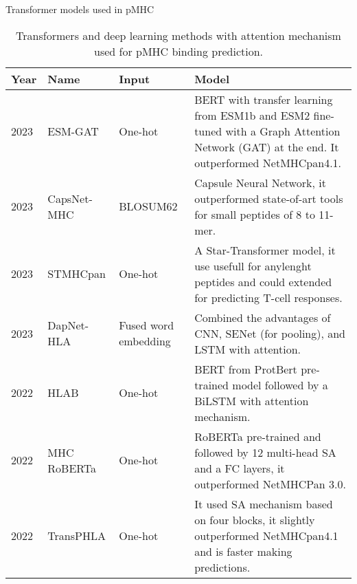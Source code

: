 \documentclass[10pt]{beamer}
\newcommand{\1}{
	\setbeamertemplate{background}{
		\texttt{[image: ../img/1]}
		\tikz[overlay] \fill[fill opacity=0.75,fill=white] (0,0) rectangle (-\paperwidth,\paperheight);
	}
}
\begin{document}
\begin{frame}{Transformer models used in pMHC}{}	
\begin{table}[h]
	
	\caption{Transformers and deep learning methods with attention mechanism used for pMHC binding prediction.}
	\label{tab:transformes}
	\setlength{\tabcolsep}{0.5em} %
	{\renewcommand{\arraystretch}{1.1}%
		\tiny
		\begin{tabular}{p{1cm}p{1cm}p{1cm}p{6cm}}
			\multicolumn{1}{l}{\textbf{Year}}                                   & \textbf{Name}             & \textbf{Input}            & \textbf{Model}     \\  \hline
			
			2023\cite{hashemi2023improved}&	ESM-GAT  &	One-hot & BERT with transfer learning from ESM1b and ESM2 fine-tuned with a Graph Attention Network (GAT) at the end. It outperformed NetMHCpan4.1.	\\
			
			
			2023\cite{kalemati2023capsnet}&	CapsNet-MHC&	BLOSUM62 & Capsule Neural Network, it outperformed state-of-art tools for small peptides of 8 to 11-mer.	\\
			
			2023\cite{ye2023stmhcpan}&	STMHCpan  &	One-hot & A Star-Transformer model, it use usefull for anylenght peptides and could extended for predicting T-cell responses.	\\
			
			2023\cite{jing2023dapnet}&	DapNet-HLA&	Fused word embedding & Combined the advantages of CNN, SENet (for pooling), and LSTM with attention.	\\
			
			2022\cite{zhang2022hlab}&	HLAB&	One-hot & BERT from ProtBert pre-trained model followed by a BiLSTM with attention mechanism.	\\
			
			2022\cite{wang2022mhcroberta}          & MHC RoBERTa            & One-hot &  RoBERTa  pre-trained and followed by 12 multi-head SA and a FC layers, it outperformed NetMHCPan 3.0.                                                                                          \\
			2022\cite{chu2022transformer}          & TransPHLA             & One-hot         & It used SA mechanism based on four blocks, it slightly outperformed NetMHCpan4.1 and is faster making predictions.\\
			

\end{tabular}}
\end{table}
\end{frame}
\end{document}
